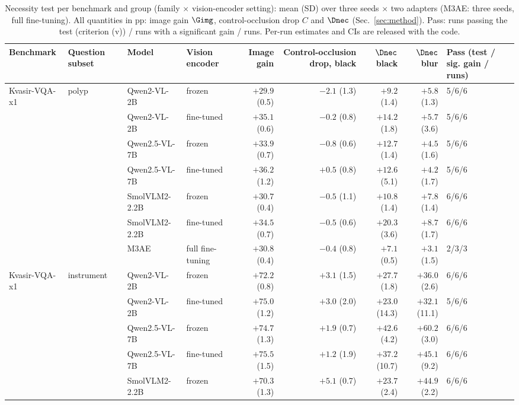\begin{table}[t]
\centering
\scriptsize
\setlength{\tabcolsep}{1pt}
\caption{Necessity test per benchmark and group (family $\times$ vision-encoder setting): mean (SD) over three seeds $\times$ two adapters (M3AE: three seeds, full fine-tuning). All quantities in pp: image gain $\Gimg$, control-occlusion drop $C$ and $\Dnec$ (Sec.~\ref{sec:method}). Pass: runs passing the test (criterion (v)) / runs with a significant gain / runs. Per-run estimates and CIs are released with the code.}
\label{tab:necessity_slim}
{%
\begin{tabular}{llllrrrrl}
\toprule
Benchmark & Question subset & Model & Vision encoder & Image gain & Control-occlusion drop, black & $\Dnec$ black & $\Dnec$ blur & Pass (test / sig. gain / runs) \\
\midrule
Kvasir-VQA-x1 & polyp & Qwen2-VL-2B & frozen & $+29.9$ (0.5) & $-2.1$ (1.3) & $+9.2$ (1.4) & $+5.8$ (1.3) & 5/6/6 \\
 &  & Qwen2-VL-2B & fine-tuned & $+35.1$ (0.6) & $-0.2$ (0.8) & $+14.2$ (1.8) & $+5.7$ (3.6) & 5/6/6 \\
 &  & Qwen2.5-VL-7B & frozen & $+33.9$ (0.7) & $-0.8$ (0.6) & $+12.7$ (1.4) & $+4.5$ (1.6) & 5/6/6 \\
 &  & Qwen2.5-VL-7B & fine-tuned & $+36.2$ (1.2) & $+0.5$ (0.8) & $+12.6$ (5.1) & $+4.2$ (1.7) & 5/6/6 \\
 &  & SmolVLM2-2.2B & frozen & $+30.7$ (0.4) & $-0.5$ (1.1) & $+10.8$ (1.4) & $+7.8$ (1.4) & 6/6/6 \\
 &  & SmolVLM2-2.2B & fine-tuned & $+34.5$ (0.7) & $-0.5$ (0.6) & $+20.3$ (3.6) & $+8.7$ (1.7) & 6/6/6 \\
 &  & M3AE & full fine-tuning & $+30.8$ (0.4) & $-0.4$ (0.8) & $+7.1$ (0.5) & $+3.1$ (1.5) & 2/3/3 \\
\midrule
Kvasir-VQA-x1 & instrument & Qwen2-VL-2B & frozen & $+72.2$ (0.8) & $+3.1$ (1.5) & $+27.7$ (1.8) & $+36.0$ (2.6) & 6/6/6 \\
 &  & Qwen2-VL-2B & fine-tuned & $+75.0$ (1.2) & $+3.0$ (2.0) & $+23.0$ (14.3) & $+32.1$ (11.1) & 5/6/6 \\
 &  & Qwen2.5-VL-7B & frozen & $+74.7$ (1.3) & $+1.9$ (0.7) & $+42.6$ (4.2) & $+60.2$ (3.0) & 6/6/6 \\
 &  & Qwen2.5-VL-7B & fine-tuned & $+75.5$ (1.5) & $+1.2$ (1.9) & $+37.2$ (10.7) & $+45.1$ (9.2) & 6/6/6 \\
 &  & SmolVLM2-2.2B & frozen & $+70.3$ (1.3) & $+5.1$ (0.7) & $+23.7$ (2.4) & $+44.9$ (2.2) & 6/6/6 \\

\end{tabular}}
\end{table}
